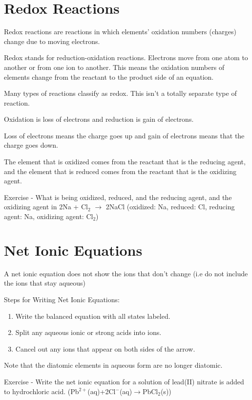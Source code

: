\documentclass[../hchem.tex]{subfiles}
\begin{document}
\section{Redox Reactions}
Redox reactions are reactions in which elements' oxidation numbers (charges) change due to moving electrons.

Redox stands for reduction-oxidation reactions. Electrons move from one atom to another or from one ion to another. This means the oxidation numbers of elements change from the reactant to the product side of an equation.

Many types of reactions classify as redox. This isn't a totally separate type of reaction.

Oxidation is loss of electrons and reduction is gain of electrons. 

Loss of electrons means the charge goes up and gain of electrons means that the charge goes down.

The element that is oxidized comes from the reactant that is the reducing agent, and the element that is reduced 
comes from the reactant that is the oxidizing agent.

Exercise - What is being oxidized, reduced, and the reducing agent, and the oxidizing agent in 2Na + Cl$_2$ $\rightarrow$ 2NaCl (oxidized: Na, reduced: Cl, reducing agent: Na, oxidizing agent: Cl$_2$)
\section{Net Ionic Equations}
A net ionic equation does not show the ions that don't change (i.e do not include the ions that stay aqueous)

Steps for Writing Net Ionic Equations:
\begin{enumerate}
    \item Write the balanced equation with all states labeled. 
    \item Split any aqueous ionic or strong acids into ions.
    \item Cancel out any ions that appear on both sides of the arrow.
\end{enumerate}

Note that the diatomic elements in aqueous form are no longer diatomic.

Exercise - Write the net ionic equation for a solution of lead(II) nitrate is added to hydrochloric acid. (Pb$^{2+}$(aq)+2Cl$^-$(aq)$\rightarrow$PbCl$_2$(s))
\end{document}
